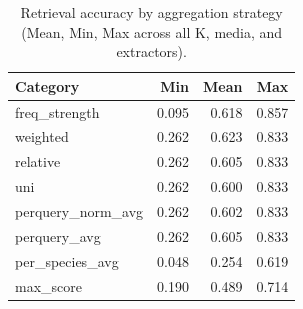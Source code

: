 \begin{table}[ht]
\centering
\caption{Retrieval accuracy by aggregation strategy (Mean, Min, Max across all K, media, and extractors).}
\label{tab:by_agg}
\small
\begin{tabular}{@{}lrrr@{}}
\toprule
Category & Min & Mean & Max \\
\midrule
freq\_strength & 0.095 & 0.618 & 0.857 \\
weighted & 0.262 & 0.623 & 0.833 \\
relative & 0.262 & 0.605 & 0.833 \\
uni & 0.262 & 0.600 & 0.833 \\
perquery\_norm\_avg & 0.262 & 0.602 & 0.833 \\
perquery\_avg & 0.262 & 0.605 & 0.833 \\
per\_species\_avg & 0.048 & 0.254 & 0.619 \\
max\_score & 0.190 & 0.489 & 0.714 \\
\bottomrule
\end{tabular}
\end{table}
